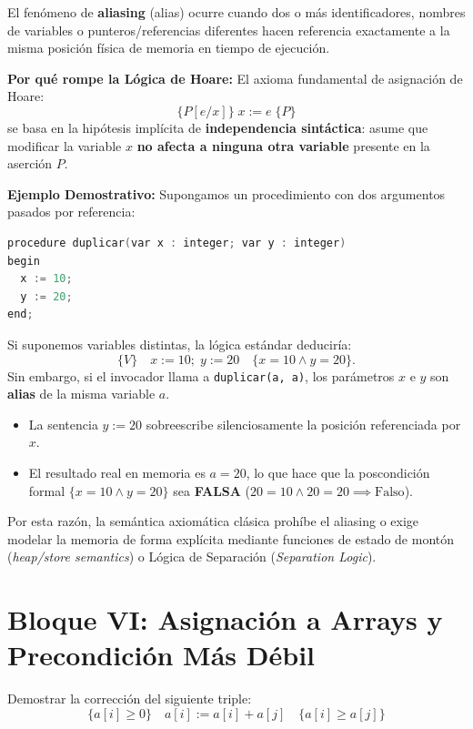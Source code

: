 \begin{solucion}
El fenómeno de \textbf{aliasing} (alias) ocurre cuando dos o más identificadores, nombres de variables o punteros/referencias diferentes hacen referencia exactamente a la misma posición física de memoria en tiempo de ejecución.

\textbf{Por qué rompe la Lógica de Hoare:}
El axioma fundamental de asignación de Hoare:
\[
\{P[e/x]\} \; x := e \; \{P\}
\]
se basa en la hipótesis implícita de \textbf{independencia sintáctica}: asume que modificar la variable $x$ \textbf{no afecta a ninguna otra variable} presente en la aserción $P$.

\textbf{Ejemplo Demostrativo:}
Supongamos un procedimiento con dos argumentos pasados por referencia:
\begin{lstlisting}[language=C++]
procedure duplicar(var x : integer; var y : integer)
begin
  x := 10;
  y := 20;
end;
\end{lstlisting}
Si suponemos variables distintas, la lógica estándar deduciría:
\[
\{V\} \quad x := 10; \; y := 20 \quad \{x = 10 \land y = 20\}.
\]
Sin embargo, si el invocador llama a \texttt{duplicar(a, a)}, los parámetros $x$ e $y$ son \textbf{alias} de la misma variable $a$.
\begin{itemize}
    \item La sentencia $y := 20$ sobreescribe silenciosamente la posición referenciada por $x$.
    \item El resultado real en memoria es $a = 20$, lo que hace que la poscondición formal $\{x = 10 \land y = 20\}$ sea \textbf{FALSA} ($20 = 10 \land 20 = 20 \implies \text{Falso}$).
\end{itemize}
Por esta razón, la semántica axiomática clásica prohíbe el aliasing o exige modelar la memoria de forma explícita mediante funciones de estado de montón (\textit{heap/store semantics}) o Lógica de Separación (\textit{Separation Logic}).
\end{solucion}

\section{Bloque VI: Asignación a Arrays y Precondición Más Débil}

\begin{ejercicio}
Demostrar la corrección del siguiente triple:
\[
\{a[i] \ge 0\} \quad a[i] := a[i] + a[j] \quad \{a[i] \ge a[j]\}
\]
\end{ejercicio}

